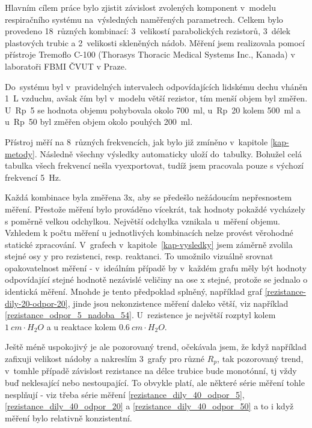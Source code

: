 
Hlavním cílem práce bylo zjistit závislost zvolených komponent v~modelu respiračního systému na~výsledných naměřených parametrech.  Celkem bylo provedeno 18~různých kombinací: 3~velikostí parabolických rezistorů, 3~délek plastových trubic a 2~velikosti skleněných nádob. Měření jsem realizovala pomocí přístroje Tremoflo C-100 (Thorasys Thoracic Medical Systems Inc., Kanada) v laboratoři FBMI ČVUT v Praze. 


Do~systému byl v~pravidelných intervalech odpovídajících lidskému dechu vháněn \SI{1}{L} vzduchu, avšak čím byl v~modelu větší rezistor, tím menší objem byl změřen. U~Rp~5 se hodnota objemu pohybovala okolo  \SI{700}{ml}, u~Rp~20 kolem  \SI{500}{ml} a u~Rp~50 byl změřen objem okolo pouhých \SI{200}{ml}.

Přístroj měří na 8~různých frekvencích, jak bylo již zmíněno v~kapitole \ref{kap-metody}. Následně všechny výsledky automaticky uloží do~tabulky. 
Bohužel celá tabulka všech frekvencí nešla vyexportovat, tudíž jsem pracovala pouze s výchozí frekvencí  \SI{5}{Hz}. 

Každá kombinace byla změřena 3x, aby se předešlo nežádoucím nepřesnostem měření. Přestože měření bylo prováděno vícekrát, tak hodnoty pokaždé vycházely s poměrně velkou odchylkou. Největší odchylka vznikala u~měření objemu.  Vzhledem k počtu měření u jednotlivých kombinacích nelze provést věrohodné statické zpracování.
V~grafech v~kapitole~\ref{kap-vysledky} jsem záměrně zvolila stejné osy y pro rezistenci, resp. reaktanci. To umožnilo vizuálně srovnat opakovatelnost měření -  v~ideálním případě by v~každém grafu měly být hodnoty odpovídající stejné hodnotě nezávislé veličiny na ose x stejné, protože se jednalo o identická měření. Mnohde je tento předpoklad splněný, například graf \ref{rezistance-dily-20-odpor-20}, jinde jsou nekonzistence měření daleko větší, viz například \ref{rezistance_odpor_5_nadoba_54}.
U~rezistence je největší rozptyl kolem $\SI{1}{ cm\cdot H_{2}O}$ a u reaktace kolem $\SI{0,6}{ cm\cdot H_{2}O}$. 


Ještě méně uspokojivý je ale pozorovaný trend, očekávala jsem, že když například zafixuji velikost nádoby a nakreslím 3~grafy pro různé $R_p$, tak pozorovaný trend, v~tomhle případě závislost rezistance na délce trubice bude monotónní, tj vždy buď neklesající nebo nestoupající. To obvykle platí, ale některé série měření tohle nesplňují - viz třeba série měření
\ref{rezistance_dily_40_odpor_5}, \ref{rezistance_dily_40_odpor_20} a \ref{rezistance_dily_40_odpor_50} a to i když měření bylo relativně konzistentní.


